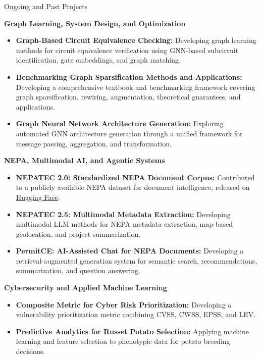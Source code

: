 \documentclass{resume} %
\begin{document}
\begin{rSection}{Ongoing and Past Projects}

\textbf{Graph Learning, System Design, and Optimization}
\begin{itemize}
    \item \textbf{Graph-Based Circuit Equivalence Checking:}
    Developing graph learning methods for circuit equivalence verification using GNN-based subcircuit identification, gate embeddings, and graph matching.

    \item \textbf{Benchmarking Graph Sparsification Methods and Applications:}
    Developing a comprehensive textbook and benchmarking framework covering graph sparsification, rewiring, augmentation, theoretical guarantees, and applications.

    \item \textbf{Graph Neural Network Architecture Generation:}
    Exploring automated GNN architecture generation through a unified framework for message passing, aggregation, and transformation.
\end{itemize}

\textbf{NEPA, Multimodal AI, and Agentic Systems}
\begin{itemize}
    \item \textbf{NEPATEC 2.0: Standardized NEPA Document Corpus:}
    Contributed to a publicly available NEPA dataset for document intelligence, released on \href{https://huggingface.co/datasets/PNNL/NEPATEC2.0}{Hugging Face}.

    \item \textbf{NEPATEC 2.5: Multimodal Metadata Extraction:}
    Developing multimodal LLM methods for NEPA metadata extraction, map-based geolocation, and project summarization.

    \item \textbf{PermitCE: AI-Assisted Chat for NEPA Documents:}
    Developing a retrieval-augmented generation system for semantic search, recommendations, summarization, and question answering.
\end{itemize}

\textbf{Cybersecurity and Applied Machine Learning}
\begin{itemize}
    \item \textbf{Composite Metric for Cyber Risk Prioritization:}
    Developing a vulnerability prioritization metric combining CVSS, CWSS, EPSS, and LEV.

    \item \textbf{Predictive Analytics for Russet Potato Selection:}
    Applying machine learning and feature selection to phenotypic data for potato breeding decisions.


\end{itemize}
\end{rSection}
\end{document}
